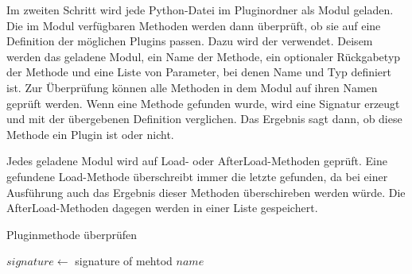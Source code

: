 Im zweiten Schritt wird jede Python-Datei im Pluginordner als Modul geladen.
Die im Modul verfügbaren Methoden werden dann überprüft, ob sie auf eine Definition der möglichen Plugins passen.
Dazu wird der  verwendet.
Deisem werden das geladene Modul, ein Name der Methode, ein optionaler Rückgabetyp der Methode und eine Liste von Parameter, bei denen Name und Typ definiert ist.
Zur Überprüfung können alle Methoden in dem Modul auf ihren Namen geprüft werden.
Wenn eine Methode gefunden wurde, wird eine Signatur erzeugt und mit der übergebenen Definition verglichen.
Das Ergebnis sagt dann, ob diese Methode ein Plugin ist oder nicht.

Jedes geladene Modul wird auf Load- oder AfterLoad-Methoden geprüft.
Eine gefundene Load-Methode überschreibt immer die letzte gefunden, da bei einer Ausführung auch das Ergebnis dieser Methoden überschireben werden würde.
Die AfterLoad-Methoden dagegen werden in einer Liste gespeichert.


\begin{algorithm}
    \caption{Pluginmethode überprüfen}
    \label{algo:check-method}




    $signature \gets$ signature of mehtod $name$




\end{algorithm}

